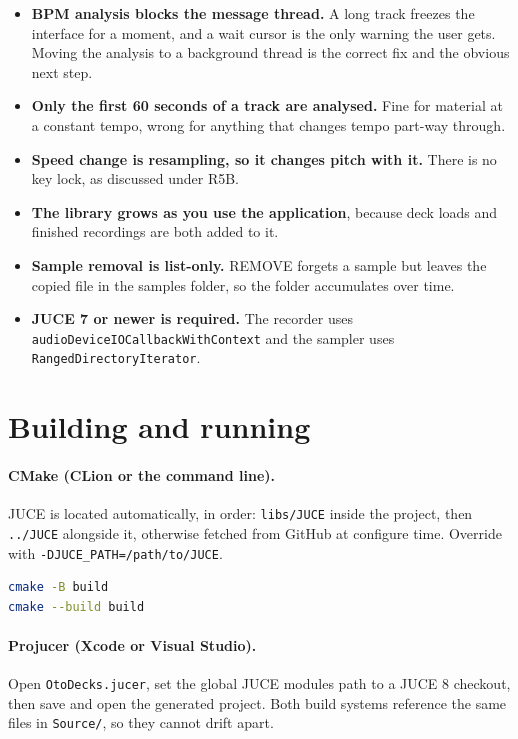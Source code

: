 \documentclass[11pt,a4paper]{article}
\newcommand{\code}[1]{\texttt{#1}}
\begin{document}
\begin{itemize}[leftmargin=1.4em]
  \item \textbf{BPM analysis blocks the message thread.} A long track freezes the
    interface for a moment, and a wait cursor is the only warning the user gets.
    Moving the analysis to a background thread is the correct fix and the obvious
    next step.
  \item \textbf{Only the first 60 seconds of a track are analysed.} Fine for
    material at a constant tempo, wrong for anything that changes tempo part-way
    through.
  \item \textbf{Speed change is resampling, so it changes pitch with it.} There is
    no key lock, as discussed under R5B.
  \item \textbf{The library grows as you use the application}, because deck loads
    and finished recordings are both added to it.
  \item \textbf{Sample removal is list-only.} REMOVE forgets a sample but leaves
    the copied file in the samples folder, so the folder accumulates over time.
  \item \textbf{JUCE 7 or newer is required.} The recorder uses
    \code{audioDeviceIOCallbackWithContext} and the sampler uses
    \code{RangedDirectoryIterator}.
\end{itemize}

\appendix
\section{Building and running}

\paragraph{CMake (CLion or the command line).} JUCE is located automatically, in
order: \code{libs/JUCE} inside the project, then \code{../JUCE} alongside it,
otherwise fetched from GitHub at configure time. Override with
\code{-DJUCE\_PATH=/path/to/JUCE}.

\begin{lstlisting}[language=bash]
cmake -B build
cmake --build build
\end{lstlisting}

\paragraph{Projucer (Xcode or Visual Studio).} Open \code{OtoDecks.jucer}, set the
global JUCE modules path to a JUCE 8 checkout, then save and open the generated
project. Both build systems reference the same files in \code{Source/}, so they
cannot drift apart.
\end{document}
